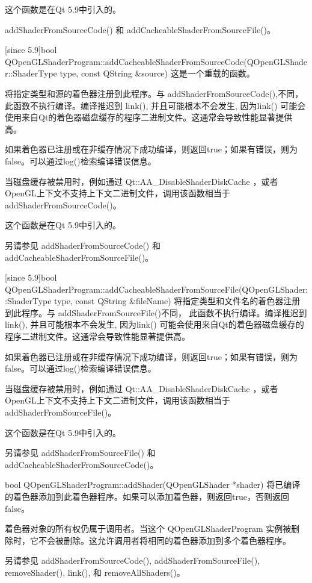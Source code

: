 这个函数是在Qt 5.9中引入的。

\begin{seeAlso}
addShaderFromSourceCode() 和 addCacheableShaderFromSourceFile()。
\end{seeAlso}

[since 5.9]bool QOpenGLShaderProgram::addCacheableShaderFromSourceCode(QOpenGLShader::ShaderType type, const QString \&source)
这是一个重载的函数。

将指定类型和源的着色器注册到此程序。与 addShaderFromSourceCode(),不同，此函数不执行编译。编译推迟到 link(), 并且可能根本不会发生, 因为link() 可能会使用来自Qt的着色器磁盘缓存的程序二进制文件。这通常会导致性能显著提供高。

如果着色器已注册或在非缓存情况下成功编译，则返回true；如果有错误，则为false。可以通过log()检索编译错误信息。

当磁盘缓存被禁用时，例如通过 Qt::AA\_DisableShaderDiskCache ，或者OpenGL上下文不支持上下文二进制文件，调用该函数相当于addShaderFromSourceCode()。

这个函数是在Qt 5.9中引入的。

另请参见 addShaderFromSourceCode() 和 addCacheableShaderFromSourceFile()。

[since 5.9]bool QOpenGLShaderProgram::addCacheableShaderFromSourceFile(QOpenGLShader::ShaderType type, const QString \&fileName)
将指定类型和文件名的着色器注册到此程序。与 addShaderFromSourceFile()不同， 此函数不执行编译。编译推迟到 link(), 并且可能根本不会发生, 因为link() 可能会使用来自Qt的着色器磁盘缓存的程序二进制文件。这通常会导致性能显著提供高。

如果着色器已注册或在非缓存情况下成功编译，则返回true；如果有错误，则为false。可以通过log()检索编译错误信息。

当磁盘缓存被禁用时，例如通过 Qt::AA\_DisableShaderDiskCache ，或者OpenGL上下文不支持上下文二进制文件，调用该函数相当于 addShaderFromSourceFile()。

这个函数是在Qt 5.9中引入的。

另请参见 addShaderFromSourceFile() 和addCacheableShaderFromSourceCode()。

bool QOpenGLShaderProgram::addShader(QOpenGLShader *shader)
将已编译的着色器添加到此着色器程序。如果可以添加着色器，则返回true，否则返回false。

着色器对象的所有权仍属于调用者。当这个 QOpenGLShaderProgram 实例被删除时，它不会被删除。这允许调用者将相同的着色器添加到多个着色器程序。

另请参见 addShaderFromSourceCode(), addShaderFromSourceFile(), removeShader(), link(), 和 removeAllShaders()。

